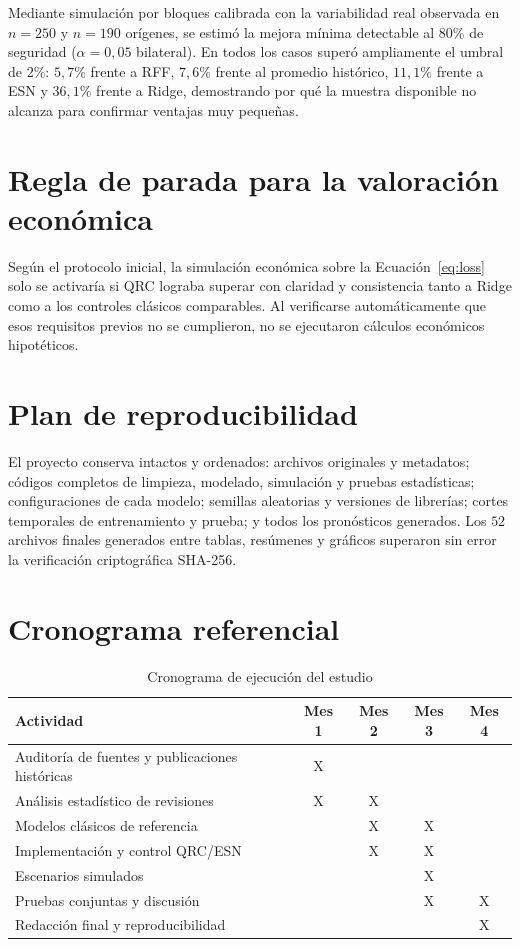 Mediante simulación por bloques calibrada con la variabilidad real observada en \(n=250\) y \(n=190\) orígenes, se estimó la mejora mínima detectable al 80\% de seguridad (\(\alpha=0{,}05\) bilateral). En todos los casos superó ampliamente el umbral de \(2\%\): \(5{,}7\%\) frente a RFF, \(7{,}6\%\) frente al promedio histórico, \(11{,}1\%\) frente a ESN y \(36{,}1\%\) frente a Ridge, demostrando por qué la muestra disponible no alcanza para confirmar ventajas muy pequeñas.

\section{Regla de parada para la valoración económica}
\label{app:voi}

Según el protocolo inicial, la simulación económica sobre la Ecuación~\ref{eq:loss} solo se activaría si QRC lograba superar con claridad y consistencia tanto a Ridge como a los controles clásicos comparables. Al verificarse automáticamente que esos requisitos previos no se cumplieron, no se ejecutaron cálculos económicos hipotéticos.

\section{Plan de reproducibilidad}
\label{app:repro}

El proyecto conserva intactos y ordenados: archivos originales y metadatos; códigos completos de limpieza, modelado, simulación y pruebas estadísticas; configuraciones de cada modelo; semillas aleatorias y versiones de librerías; cortes temporales de entrenamiento y prueba; y todos los pronósticos generados. Los \(52\) archivos finales generados entre tablas, resúmenes y gráficos superaron sin error la verificación criptográfica SHA-256.

\clearpage
\section{Cronograma referencial}
\label{app:cronograma}

\begin{table}[!ht]
	\centering
	\caption{Cronograma de ejecución del estudio}
	\small
	\renewcommand{\arraystretch}{1.15}
	\begin{tabular}{@{}>{\raggedright\arraybackslash}p{5.2cm}cccc@{}}
		\toprule
		Actividad & Mes 1 & Mes 2 & Mes 3 & Mes 4\\
		\midrule
		Auditoría de fuentes y publicaciones históricas & X & & &\\
		Análisis estadístico de revisiones & X & X & &\\
		Modelos clásicos de referencia & & X & X &\\
		Implementación y control QRC/ESN & & X & X &\\
		Escenarios simulados & & & X &\\
		Pruebas conjuntas y discusión & & & X & X\\
		Redacción final y reproducibilidad & & & & X\\
		\bottomrule
	\end{tabular}
\end{table}

